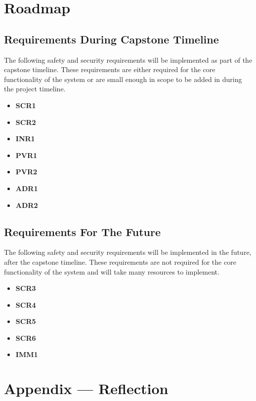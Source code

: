 \documentclass{article}
\begin{document}
\section{Roadmap}

\subsection{Requirements During Capstone Timeline}
The following safety and security requirements will be implemented as part of the capstone timeline. These requirements are either required for the core functionality of the system or are small enough in scope to be added in during the project timeline.
\begin{itemize}
    \item \textbf{SCR1}
    \item \textbf{SCR2}
    \item \textbf{INR1}
    \item \textbf{PVR1}
    \item \textbf{PVR2}
    \item \textbf{ADR1}
    \item \textbf{ADR2}
\end{itemize}
\subsection{Requirements For The Future}
The following safety and security requirements will be implemented in the future, after the capstone timeline. These requirements are not required for the core functionality of the system and will take many resources to implement.
\begin{itemize}
    \item \textbf{SCR3}
    \item \textbf{SCR4}
    \item \textbf{SCR5}
    \item \textbf{SCR6}
    \item \textbf{IMM1}
\end{itemize}

\newpage{}

\section*{Appendix --- Reflection}


\end{document}
